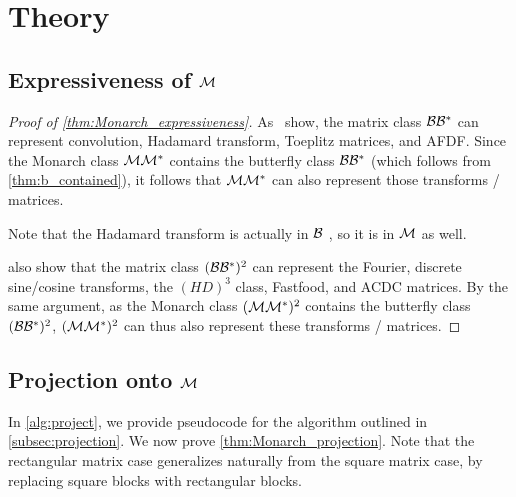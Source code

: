 \section{Theory}
\label{sec:proofs}

\subsection{Expressiveness of $\mathcal{M}$}
\label{subsec:expressiveness_proof}

\begin{proof}[Proof of \cref{thm:Monarch_expressiveness}]
  As~\citet[Appendix J]{dao2020kaleidoscope} show, the matrix class $\mathcal{B}\mathcal{B}^*$ can
  represent convolution, Hadamard transform, Toeplitz matrices, and AFDF.
  Since the Monarch class $\mathcal{M}\mathcal{M}^*$ contains the butterfly class $\mathcal{B}\mathcal{B}^*$ (which follows from \cref{thm:b_contained}), it follows
  that $\mathcal{M}\mathcal{M}^*$ can also represent those transforms / matrices.

  Note that the Hadamard transform is actually in $\mathcal{B}$ \citep{dao2020kaleidoscope}, so it is in $\mathcal{M}$ as well.

  \citet[Appendix J]{dao2020kaleidoscope} also show that the matrix class $(\mathcal{B}\mathcal{B}^*)^2$ can
  represent the Fourier, discrete sine/cosine transforms, the $(HD)^3$ class,
  Fastfood, and ACDC matrices.
  By the same argument, as the Monarch class $(\mathcal{M}\mathcal{M}^*)^2$ contains the butterfly
  class $(\mathcal{B}\mathcal{B}^*)^2$, $(\mathcal{M}\mathcal{M}^*)^2$ can thus also represent these transforms / matrices.
\end{proof}

\subsection{Projection onto $\mathcal{M}$}

In \cref{alg:project}, we provide pseudocode for the algorithm outlined in
\cref{subsec:projection}.
We now prove \cref{thm:Monarch_projection}.
Note that the rectangular matrix case generalizes naturally from the square matrix case, by replacing square blocks with rectangular blocks.

